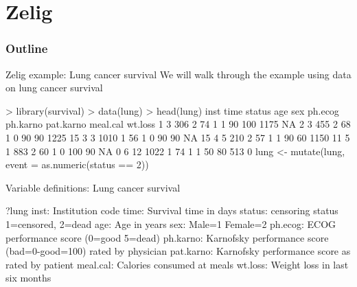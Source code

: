 \documentclass{beamer}
\begin{document}
\section{Zelig}

\begin{frame}
\frametitle{Outline}
\tableofcontents[currentsection]
\end{frame}


\begin{frame}[fragile]{Zelig example: Lung cancer survival}
We will walk through the example using data on lung cancer survival
\begin{scriptsize}
\begin{semiverbatim}
> library(survival)
> data(lung)
> head(lung)
  inst time status age sex ph.ecog ph.karno pat.karno meal.cal wt.loss
1    3  306      2  74   1       1       90       100     1175      NA
2    3  455      2  68   1       0       90        90     1225      15
3    3 1010      1  56   1       0       90        90       NA      15
4    5  210      2  57   1       1       90        60     1150      11
5    1  883      2  60   1       0      100        90       NA       0
6   12 1022      1  74   1       1       50        80      513       0
lung <- mutate(lung, event = as.numeric(status == 2))
\end{semiverbatim} 
\end{scriptsize}
\end{frame}

\begin{frame}[fragile]{Variable definitions: Lung cancer survival}
\begin{scriptsize}
\begin{semiverbatim}
?lung
inst:	Institution code
time:	Survival time in days
status:	censoring status 1=censored, 2=dead
age:	Age in years
sex:	Male=1 Female=2
ph.ecog:	ECOG performance score (0=good 5=dead)
ph.karno:	Karnofsky performance score (bad=0-good=100) rated by physician
pat.karno:	Karnofsky performance score as rated by patient
meal.cal:	Calories consumed at meals
wt.loss:	Weight loss in last six months
\end{semiverbatim}
\end{scriptsize}
\end{frame}
\end{document}

